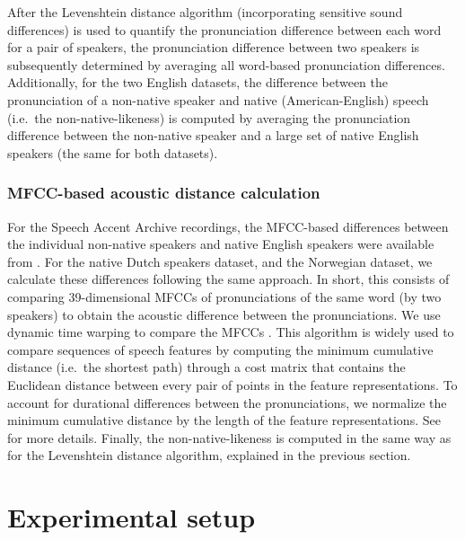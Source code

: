 \documentclass[11pt,a4paper]{article}
\begin{document}
After the Levenshtein distance algorithm (incorporating sensitive sound differences) is used to quantify the pronunciation difference between each word for a pair of speakers, the pronunciation difference between two speakers is subsequently determined by averaging all word-based pronunciation differences. Additionally, for the two English datasets, the difference between the pronunciation of a non-native speaker and native (American-English) speech (i.e.~the non-native-likeness) is computed by averaging the pronunciation difference between the non-native speaker and a large set of native English speakers (the same for both datasets).

\subsubsection{MFCC-based acoustic distance calculation}
For the Speech Accent Archive recordings, the MFCC-based differences between the individual non-native speakers and native English speakers were available from \citet{acoustic-measure}. 
For the native Dutch speakers dataset, and the Norwegian dataset, we calculate these differences following the same approach. 
In short, this consists of comparing 39-dimensional MFCCs of pronunciations of the same word (by two speakers) to obtain the acoustic difference between the pronunciations.
We use dynamic time warping to compare the MFCCs \citep{giorgino2009}.
This algorithm is widely used to compare sequences of speech features by computing the minimum cumulative distance (i.e.~the shortest path) through a cost matrix that contains the Euclidean distance between every pair of points in the feature representations.
To account for durational differences between the pronunciations, we normalize the minimum cumulative distance by the length of the feature representations.
See \citet{acoustic-measure} for more details. Finally, the non-native-likeness is computed in the same way as for the Levenshtein distance algorithm, explained in the previous section. 

\section{Experimental setup}
\end{document}
